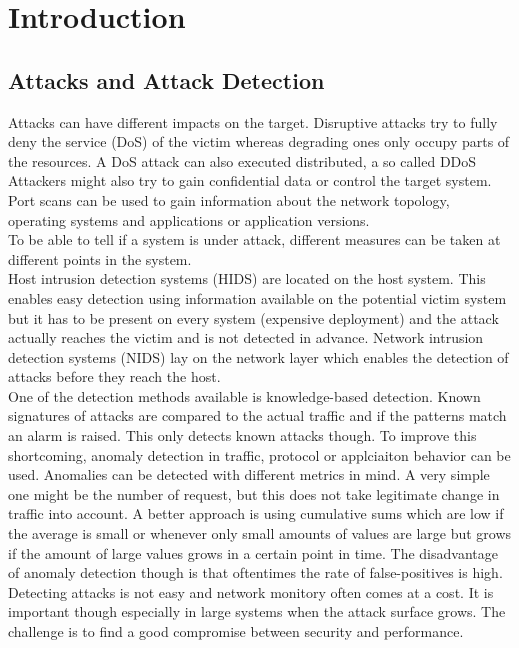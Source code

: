 
\section{Introduction}

\subsection{Attacks and Attack Detection}
Attacks can have different impacts on the target.
Disruptive attacks try to fully deny the service (DoS) of the victim whereas degrading ones only occupy parts of the resources.
A DoS attack can also executed distributed, a so called DDoS
Attackers might also try to gain confidential data or control the target system.
Port scans can be used to gain information about the network topology, operating systems and applications or application versions.\\

To be able to tell if a system is under attack, different measures can be taken at different points in the system.\\
Host intrusion detection systems (HIDS) are located on the host system.
This enables easy detection using information available on the potential victim system but it has to be present on every system (expensive deployment) and the attack actually reaches the victim and is not detected in advance.
Network intrusion detection systems (NIDS) lay on the network layer which enables the detection of attacks before they reach the host.\\
One of the detection methods available is knowledge-based detection.
Known signatures of attacks are compared to the actual traffic and if the patterns match an alarm is raised.
This only detects known attacks though.
To improve this shortcoming, anomaly detection in traffic, protocol or applciaiton behavior can be used.
Anomalies can be detected with different metrics in mind.
A very simple one might be the number of request, but this does not take legitimate change in traffic into account.
A better approach is using cumulative sums which are low if the average is small or whenever only small amounts of values are large but grows if the amount of large values grows in a certain point in time.
The disadvantage of anomaly detection though is that oftentimes the rate of false-positives is high.\\
Detecting attacks is not easy and network monitory often comes at a cost.
It is important though especially in large systems when the attack surface grows.
The challenge is to find a good compromise between security and performance.


